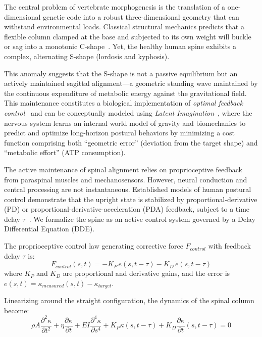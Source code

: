 \documentclass[11pt]{article}
\begin{document}
The central problem of vertebrate morphogenesis is the translation of a one-dimensional genetic code into a robust three-dimensional geometry that can withstand environmental loads. Classical structural mechanics predicts that a flexible column clamped at the base and subjected to its own weight will buckle or sag into a monotonic C-shape~\cite{goriely2017mathematics}. Yet, the healthy human spine exhibits a complex, alternating S-shape (lordosis and kyphosis).

This anomaly suggests that the S-shape is not a passive equilibrium but an actively maintained sagittal alignment---a geometric standing wave maintained by the continuous expenditure of metabolic energy against the gravitational field. This maintenance constitutes a biological implementation of \emph{optimal feedback control}~\cite{todorov2002optimal} and can be conceptually modeled using \emph{Latent Imagination}~\cite{hafner2019dreamer}, where the nervous system learns an internal world model of gravity and biomechanics to predict and optimize long-horizon postural behaviors by minimizing a cost function comprising both ``geometric error'' (deviation from the target shape) and ``metabolic effort'' (ATP consumption).

The active maintenance of spinal alignment relies on proprioceptive feedback from paraspinal muscles and mechanosensors. However, neural conduction and central processing are not instantaneous. Established models of human postural control demonstrate that the upright state is stabilized by proportional-derivative (PD) or proportional-derivative-acceleration (PDA) feedback, subject to a time delay $\tau$~\cite{milton2009time, insperger2013acceleration}. We formalize the spine as an active control system governed by a Delay Differential Equation (DDE).

The proprioceptive control law generating corrective force $F_{control}$ with feedback delay $\tau$ is:
\begin{equation}
F_{control}(s,t) = -K_P \, e(s, t-\tau) - K_D \, \dot{e}(s, t-\tau)
\label{eq:pd_control}
\end{equation}
where $K_P$ and $K_D$ are proportional and derivative gains, and the error is $e(s,t) = \kappa_{measured}(s,t) - \kappa_{target}$.

Linearizing around the straight configuration, the dynamics of the spinal column become:
\begin{equation}
\rho A \frac{\partial^2 \kappa}{\partial t^2} + \eta \frac{\partial \kappa}{\partial t} + EI \frac{\partial^4 \kappa}{\partial s^4} + K_P \kappa(s, t-\tau) + K_D \frac{\partial \kappa}{\partial t}(s, t-\tau) = 0
\label{eq:dde_spine}
\end{equation}
\end{document}
